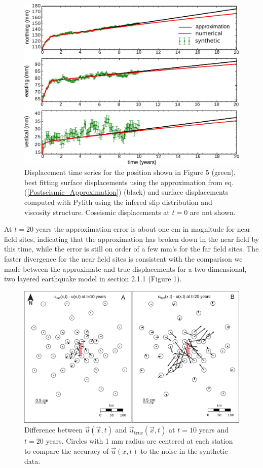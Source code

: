 \documentclass[extra,mreferee]{gji}
\begin{document}
\begin{figure}\label{figure6}
  \centering
  \includegraphics[scale=0.6]{FinalFigures/Figure5.pdf}
  \caption{Displacement time series for the position shown in Figure 5
    (green), best fitting surface displacements using the
    approximation from eq. (\ref{Postseismic_Approximation}) (black)
    and surface displacements computed with Pylith using the infered
    slip distribution and viscosity structure. Coseismic displacements
    at $t=0$ are not shown.}
  \label{Figure 6}
\end{figure}

At $t=20$ years the approximation error is about
one cm in magnitude for near field sites, indicating that the
approximation has broken down in the near field by this time, while
the error is still on order of a few mm's for the far field
sites.  The faster divergence for the near field sites is consistent
with the comparison we made between the approximate and true
displacements for a two-dimensional, two layered earthquake model in
section 2.1.1 (Figure 1).

\begin{figure}\label{figure7}
  \centering
  \includegraphics[scale=0.6]{FinalFigures/Figure7.pdf}
  \caption{Difference between $\vec{u}(\vec{x},t)$ and
    $\vec{u}_{\mathrm{true}}(\vec{x},t)$ at $t=10$ years and $t=20$ years.
    Circles with 1 mm radius are centered at each station to compare
    the accuracy of $\vec{u}(x,t)$ to the noise in
    the synthetic data.}
  \label{Figure 7}
\end{figure}
\end{document}
